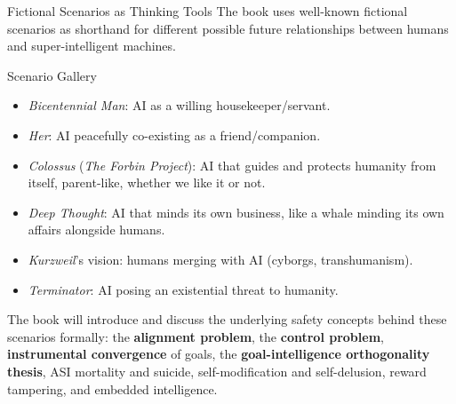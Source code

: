 \documentclass[aspectratio=169,10pt]{beamer}
\begin{document}
\begin{frame}{Fictional Scenarios as Thinking Tools}
  The book uses well-known fictional scenarios as shorthand for different
  possible future relationships between humans and super-intelligent
  machines.

  \begin{block}{Scenario Gallery}
    \begin{itemize}
      \item \emph{Bicentennial Man}: AI as a willing housekeeper/servant.
      \item \emph{Her}: AI peacefully co-existing as a friend/companion.
      \item \emph{Colossus} (\emph{The Forbin Project}): AI that guides and
        protects humanity from itself, parent-like, whether we like it or
        not.
      \item \emph{Deep Thought}: AI that minds its own business, like a
        whale minding its own affairs alongside humans.
      \item \emph{Kurzweil}'s vision: humans merging with AI (cyborgs,
        transhumanism).
      \item \emph{Terminator}: AI posing an existential threat to humanity.
    \end{itemize}
  \end{block}
  The book will introduce and discuss the underlying safety concepts behind
  these scenarios formally: the \textbf{alignment problem}, the
  \textbf{control problem}, \textbf{instrumental convergence} of goals, the
  \textbf{goal-intelligence orthogonality thesis}, ASI mortality and
  suicide, self-modification and self-delusion, reward tampering, and
  embedded intelligence.
\end{frame}
\end{document}
